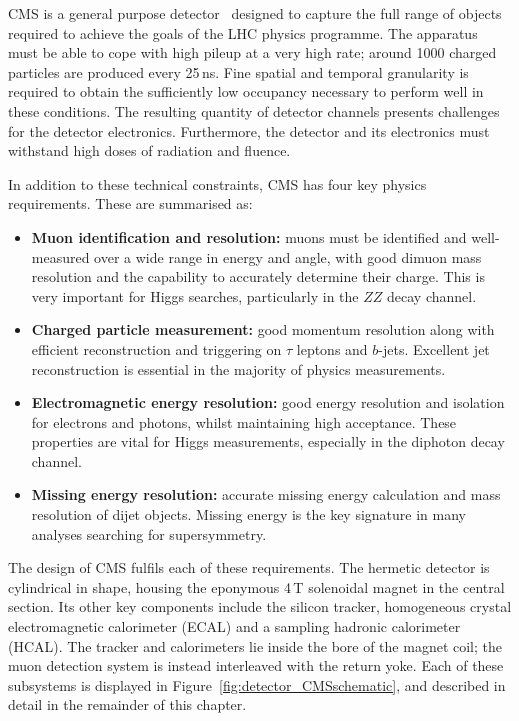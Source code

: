 CMS is a general purpose detector~\cite{CMSdetector} designed to capture the full range of objects required to achieve the goals of the LHC physics programme.
The apparatus must be able to cope with high pileup at a very high rate; around 1000 charged particles are produced every 25\,ns.
Fine spatial and temporal granularity is required to obtain the sufficiently low occupancy necessary to perform well in these conditions.
The resulting quantity of detector channels presents challenges for the detector electronics.
Furthermore, the detector and its electronics must withstand high doses of radiation and fluence.

In addition to these technical constraints, CMS has four key physics requirements.
These are summarised as:
\begin{itemize}
  \item{\textbf{Muon identification and resolution:}
  muons must be identified and well-measured over a wide range in energy and angle, 
  with good dimuon mass resolution and the capability to accurately determine their charge.
  This is very important for Higgs searches, particularly in the $ZZ$ decay channel.}
  \item{\textbf{Charged particle measurement:}
  good momentum resolution along with efficient reconstruction and triggering on $\tau$ leptons and $b$-jets.
  Excellent jet reconstruction is essential in the majority of physics measurements.}
  \item{\textbf{Electromagnetic energy resolution:}
  good energy resolution and isolation for electrons and photons, whilst maintaining high acceptance.
  These properties are vital for Higgs measurements, especially in the diphoton decay channel.}
  \item{\textbf{Missing energy resolution:}
  accurate missing energy calculation and mass resolution of dijet objects.
  Missing energy is the key signature in many analyses searching for supersymmetry.}
\end{itemize}

The design of CMS fulfils each of these requirements.
The hermetic detector is cylindrical in shape, housing the eponymous 4\,T solenoidal magnet in the central section.
Its other key components include the silicon tracker, homogeneous crystal electromagnetic calorimeter (ECAL) and a sampling hadronic calorimeter (HCAL).
The tracker and calorimeters lie inside the bore of the magnet coil; the muon detection system is instead interleaved with the return yoke.
Each of these subsystems is displayed in Figure~\ref{fig:detector_CMSschematic}, and described in detail in the remainder of this chapter.


